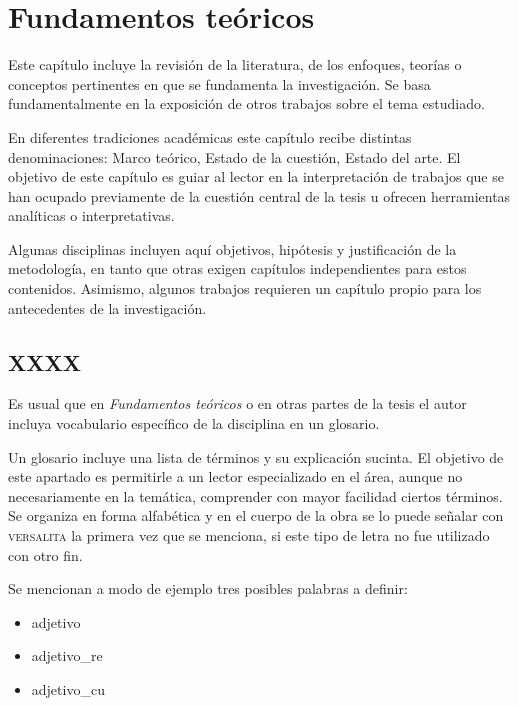 \chapter{Fundamentos teóricos}

Este capítulo incluye la revisión de la literatura, de los enfoques, teorías o conceptos pertinentes en que se fundamenta la investigación. Se basa fundamentalmente en la exposición de otros trabajos sobre el tema estudiado.

En diferentes tradiciones académicas este capítulo recibe distintas denominaciones: Marco teórico, Estado de la cuestión, Estado del arte. El objetivo de este capítulo es guiar al lector en la interpretación de trabajos que se han ocupado previamente de la cuestión central de la tesis u ofrecen herramientas analíticas o interpretativas. 

Algunas disciplinas incluyen aquí objetivos, hipótesis y justificación de la metodología, en tanto que otras exigen capítulos independientes para estos contenidos. Asimismo, algunos trabajos requieren un capítulo propio para los antecedentes de la investigación.



\section{XXXX}

Es usual que en \textit{Fundamentos teóricos} o en otras partes de la tesis el autor incluya vocabulario específico de la disciplina en un glosario.

Un glosario incluye una lista de términos y su explicación sucinta. El objetivo de este apartado es permitirle a un lector especializado en el área, aunque no necesariamente en la temática, comprender con mayor facilidad ciertos términos. 
Se organiza en forma alfabética y en el cuerpo de la obra se lo puede señalar con \textsc{versalita} la primera vez que se menciona, si este tipo de letra no fue utilizado con otro fin.

Se mencionan a modo de ejemplo tres posibles palabras a definir:
%
\begin{itemize}
\item \gls{adjetivo}
\item \gls{adjetivo_re}
\item \gls{adjetivo_cu}
\end{itemize}


